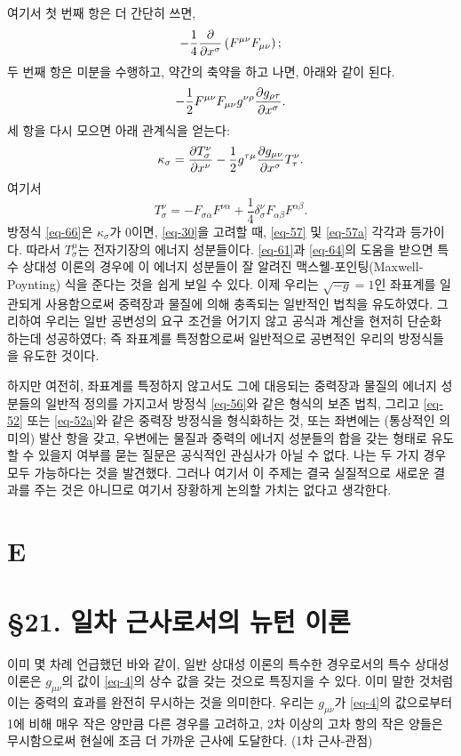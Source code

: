 \documentclass[b5paper]{article}
\begin{document}
여기서 첫 번째 항은 더 간단히 쓰면,
\begin{equation*}
	-\frac{1}{4}{\frac{{\partial}{}}{{\partial}{x^\sigma}}}\left(F^{\mu\nu} F_{\mu\nu}\right);
\end{equation*}
두 번째 항은 미분을 수행하고, 약간의 축약을 하고 나면, 아래와 같이 된다.
\begin{equation*}
	-\frac{1}{2} F^{\mu\nu} F_{\mu\nu} g^{\nu\rho} {\frac{{\partial}{g_{\rho\tau}}}{{\partial}{x^\sigma}}}.
\end{equation*}
세 항을 다시 모으면 아래 관계식을 얻는다:
\begin{equation} \label{eq-66}
	\kappa_\sigma = {\frac{{\partial}{T_\sigma^\nu}}{{\partial}{x^\nu}}} - \frac{1}{2} g^{\tau\mu} {\frac{{\partial}{g_{\mu\nu}}}{{\partial}{x^\sigma}}} T_\tau^\nu.
\end{equation}
여기서
\begin{equation*}
	T_\sigma^\nu = -F_{\sigma\alpha} F^{\nu\alpha} + \frac{1}{4} \delta_\sigma^\nu F_{\alpha\beta} F^{\alpha\beta}.
\end{equation*}
방정식 \eqref{eq-66}은 $\kappa_\sigma$가 0이면, \eqref{eq-30}을 고려할 때, \eqref{eq-57} 및 \eqref{eq-57a} 각각과 등가이다. 따라서 $T_\sigma^\mu$는 전자기장의 에너지 성분들이다.
\eqref{eq-61}과 \eqref{eq-64}의 도움을 받으면 특수 상대성 이론의 경우에 이 에너지 성분들이  잘 알려진 맥스웰-포인팅(Maxwell-Poynting) 식을 준다는 것을 쉽게 보일 수 있다.
이제 우리는 $\sqrt{-g}=1$인 좌표계를 일관되게 사용함으로써 중력장과 물질에 의해 충족되는 일반적인 법칙을 유도하였다. 그리하여 우리는 일반 공변성의 요구 조건을 어기지 않고 공식과 계산을 현저히 단순화 하는데 성공하였다; 즉 좌표계를 특정함으로써 일반적으로 공변적인 우리의 방정식들을 유도한 것이다.

하지만 여전히, 좌표계를 특정하지 않고서도 그에 대응되는 중력장과 물질의 에너지 성분들의 일반적 정의를 가지고서 방정식 \eqref{eq-56}와 같은 형식의 보존 법칙, 그리고 \eqref{eq-52} 또는 \eqref{eq-52a}와 같은 중력장 방정식을 형식화하는 것, 또는 좌변에는 (통상적인 의미의) 발산 항을 갖고, 우변에는 물질과 중력의 에너지 성분들의 합을 갖는 형태로 유도할 수 있을지 여부를 묻는 질문은 공식적인 관심사가 아닐 수 없다. 나는 두 가지 경우 모두 가능하다는 것을 발견했다. 그러나 여기서 이 주제는 결국 실질적으로 새로운 결과를 주는 것은 아니므로 여기서 장황하게 논의할 가치는 없다고 생각한다.

\section*{E}
\section*{\S 21. 일차 근사로서의 뉴턴 이론}
이미 몇 차례 언급했던 바와 같이, 일반 상대성 이론의 특수한 경우로서의 특수 상대성 이론은 $g_{\mu\nu}$의 값이 \eqref{eq-4}의 상수 값을 갖는 것으로 특징지을 수 있다. 이미 말한 것처럼 이는 중력의 효과를 완전히 무시하는 것을 의미한다. 우리는 $g_{\mu\nu}$가 \eqref{eq-4}의 값으로부터 1에 비해 매우 작은 양만큼 다른 경우를 고려하고, 2차 이상의 고차 항의 작은 양들은 무시함으로써 현실에 조금 더 가까운 근사에 도달한다. (1차 근사-관점)
\end{document}
